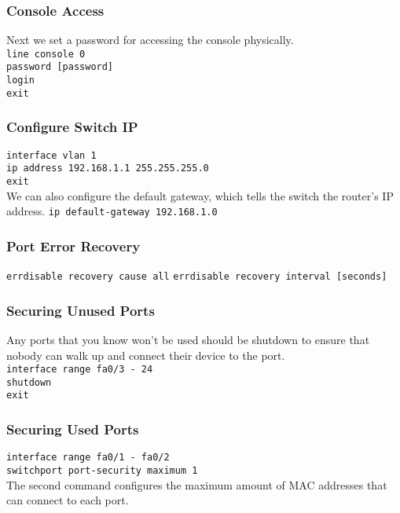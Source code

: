 \documentclass{ol-softwaremanual}
\begin{document}
            \subsubsection{Console Access}\label{subsubsec:console}
            Next we set a password for accessing the console physically. \\
            \verb|line console 0|\\
            \verb|password [password]|\\
            \verb|login|\\
            \verb|exit|\\

            \subsubsection{Configure Switch IP}\label{subsubsec:ip}
            \verb|interface vlan 1|\\
            \verb|ip address 192.168.1.1 255.255.255.0|\\
            \verb|exit|\\
            We can also configure the default gateway, which tells the switch the router's IP address.
            \verb|ip default-gateway 192.168.1.0|

            \subsubsection{Port Error Recovery}\label{subsubsec:errdisable}
            \verb|errdisable recovery cause all|
            \verb|errdisable recovery interval [seconds]|

            \subsubsection{Securing Unused Ports}\label{subsubsec:unusedports}
            Any ports that you know won't be used should be shutdown to ensure that nobody can walk up and connect their device to the port.\\
            \verb|interface range fa0/3 - 24|\\
            \verb|shutdown|\\
            \verb|exit|\\

            \subsubsection{Securing Used Ports}\label{subsubsec:usedports}
            \verb|interface range fa0/1 - fa0/2|\\
            \verb|switchport port-security maximum 1|\\
            The second command configures the maximum amount of MAC addresses that can connect to each port.
\end{document}
